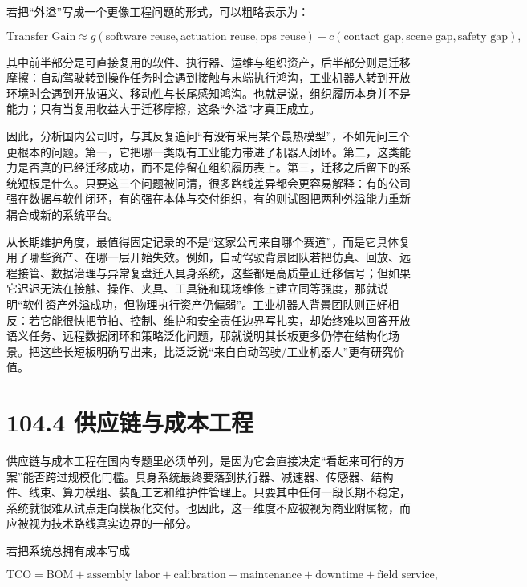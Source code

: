 若把“外溢”写成一个更像工程问题的形式，可以粗略表示为：

\begingroup
\scriptsize
\begin{equation*}
\text{Transfer Gain} \approx g(\text{software reuse}, \text{actuation reuse}, \text{ops reuse}) - c(\text{contact gap}, \text{scene gap}, \text{safety gap}),
\end{equation*}
\endgroup

其中前半部分是可直接复用的软件、执行器、运维与组织资产，后半部分则是迁移摩擦：自动驾驶转到操作任务时会遇到接触与末端执行鸿沟，工业机器人转到开放环境时会遇到开放语义、移动性与长尾感知鸿沟。也就是说，组织履历本身并不是能力；只有当复用收益大于迁移摩擦，这条“外溢”才真正成立。

因此，分析国内公司时，与其反复追问“有没有采用某个最热模型”，不如先问三个更根本的问题。第一，它把哪一类既有工业能力带进了机器人闭环。第二，这类能力是否真的已经迁移成功，而不是停留在组织履历表上。第三，迁移之后留下的系统短板是什么。只要这三个问题被问清，很多路线差异都会更容易解释：有的公司强在数据与软件闭环，有的强在本体与交付组织，有的则试图把两种外溢能力重新耦合成新的系统平台。

从长期维护角度，最值得固定记录的不是“这家公司来自哪个赛道”，而是它具体复用了哪些资产、在哪一层开始失效。例如，自动驾驶背景团队若把仿真、回放、远程接管、数据治理与异常复盘迁入具身系统，这些都是高质量正迁移信号；但如果它迟迟无法在接触、操作、夹具、工具链和现场维修上建立同等强度，那就说明“软件资产外溢成功，但物理执行资产仍偏弱”。工业机器人背景团队则正好相反：若它能很快把节拍、控制、维护和安全责任边界写扎实，却始终难以回答开放语义任务、远程数据闭环和策略泛化问题，那就说明其长板更多仍停在结构化场景。把这些长短板明确写出来，比泛泛说“来自自动驾驶/工业机器人”更有研究价值。

\section*{104.4 供应链与成本工程}


供应链与成本工程在国内专题里必须单列，是因为它会直接决定“看起来可行的方案”能否跨过规模化门槛。具身系统最终要落到执行器、减速器、传感器、结构件、线束、算力模组、装配工艺和维护件管理上。只要其中任何一段长期不稳定，系统就很难从试点走向模板化交付。也因此，这一维度不应被视为商业附属物，而应被视为技术路线真实边界的一部分。

若把系统总拥有成本写成

\begingroup
\scriptsize
\begin{equation*}
\text{TCO} =
\text{BOM} + \text{assembly labor} + \text{calibration} + \text{maintenance} + \text{downtime} + \text{field service},
\end{equation*}
\endgroup

